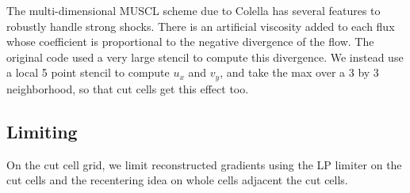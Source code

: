 The multi-dimensional MUSCL scheme due to Colella has several features to robustly
handle strong shocks. There is an artificial viscosity added to each flux whose
coefficient is proportional to the negative divergence of the flow.  The original
code used a very large stencil to compute this divergence. We instead use a local 5
point stencil to compute $u_x$ and $v_y$, and take the max over a 3 by 3
neighborhood, so that cut cells get this effect too.

\subsection{Limiting}
On the cut cell grid, we limit reconstructed gradients using the LP limiter on the cut cells and the recentering idea on whole cells adjacent the cut cells.  
